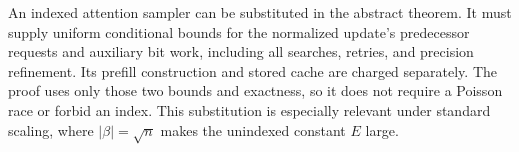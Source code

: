 An indexed attention sampler can be substituted in the abstract theorem.
It must supply uniform conditional bounds for the normalized update's
predecessor requests and auxiliary bit work, including all searches,
retries, and precision refinement. Its prefill construction and stored
cache are charged separately. The proof uses only those two bounds and
exactness, so it does not require a Poisson race or forbid an index.
This substitution is especially relevant under standard scaling, where
$|\beta|=\sqrt n$ makes the unindexed constant $E$ large.

